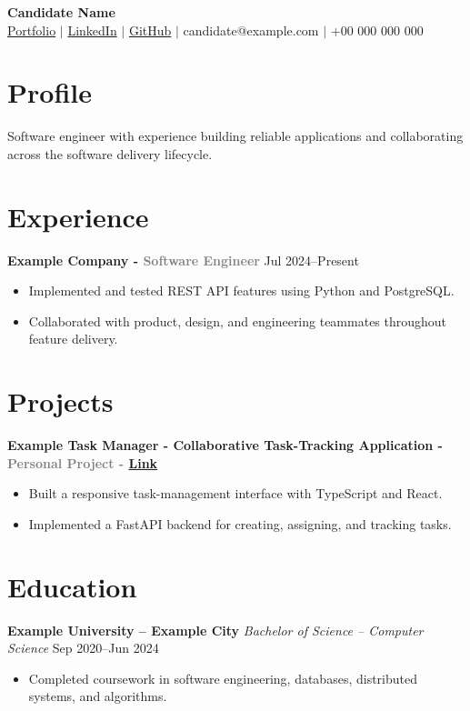 \documentclass[a4paper,10pt]{article}
\begin{document}
\singlespacing

\begin{center}
  {\Huge \textbf{Candidate Name}} \\[0.10cm]
  \href{https://example.com/portfolio}{Portfolio} $\vert$
  \href{https://example.com/linkedin}{LinkedIn} $\vert$
  \href{https://example.com/github}{GitHub} $\vert$
  candidate@example.com $\vert$ +00 000 000 000
\end{center}

\begin{small}
\section*{Profile}

Software engineer with experience building reliable applications and
collaborating across the software delivery lifecycle.

\section*{Experience}

\textbf{Example Company - \textcolor{gray}{Software Engineer}} \hfill Jul 2024--Present
\begin{itemize}[leftmargin=*]
\item Implemented and tested REST API features using Python and PostgreSQL.
\item Collaborated with product, design, and engineering teammates throughout feature delivery.
\end{itemize}

\section*{Projects}

\textbf{Example Task Manager - Collaborative Task-Tracking Application -
\textcolor{gray}{Personal Project - \href{https://example.com/task-manager}{Link}}}
\begin{itemize}[leftmargin=*]
\item Built a responsive task-management interface with TypeScript and React.
\item Implemented a FastAPI backend for creating, assigning, and tracking tasks.
\end{itemize}

\section*{Education}
\textbf{Example University -- Example City}
\emph{Bachelor of Science -- Computer Science} \hfill Sep 2020--Jun 2024
\begin{itemize}[leftmargin=*]
\item Completed coursework in software engineering, databases, distributed systems, and algorithms.
\end{itemize}


\end{small}
\end{document}
